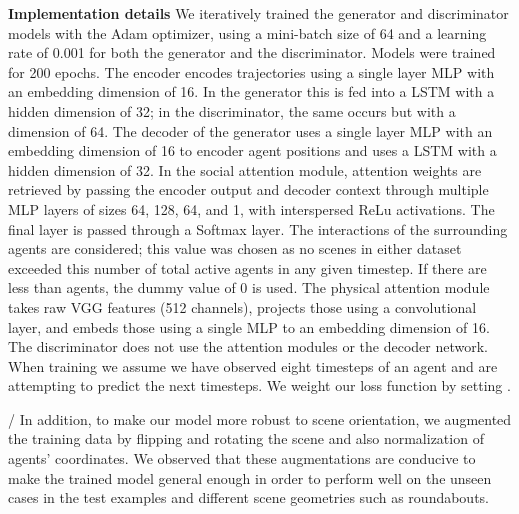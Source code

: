 \documentclass[10pt,twocolumn,letterpaper]{article}
\begin{document}
\textbf{Implementation details} We iteratively trained the generator and discriminator models with the Adam optimizer, using a mini-batch size of 64 and a learning rate of 0.001 for both the generator and the discriminator. Models were trained for 200 epochs. The encoder encodes trajectories using a single layer MLP with an embedding dimension of 16. In the generator this is fed into a LSTM with a hidden dimension of 32; in the discriminator, the same occurs but with a dimension of 64. The decoder of the generator uses a single layer MLP with an embedding dimension of 16 to encoder agent positions and uses a LSTM with a hidden dimension of 32. In the social attention module, attention weights are retrieved by passing the encoder output and decoder context through multiple MLP layers of sizes 64, 128, 64, and 1, with interspersed ReLu activations. The final layer is passed through a Softmax layer. The interactions of the surrounding  agents are considered; this value was chosen as no scenes in either dataset exceeded this number of total active agents in any given timestep. If there are less than  agents, the dummy value of 0 is used. The physical attention module takes raw VGG features (512 channels), projects those using a convolutional layer, and embeds those using a single MLP to an embedding dimension of 16. The discriminator does not use the attention modules or the decoder network. When training we assume we have observed eight timesteps of an agent and are attempting to predict the next  timesteps. We weight our loss function by setting .

/
In addition, to make our model more robust to scene orientation, we augmented the training data by flipping and rotating the scene and also normalization of agents' coordinates. We observed that these augmentations are conducive to make the trained model general enough in order to perform well on the unseen cases in the test examples and different scene geometries such as roundabouts.
\end{document}
